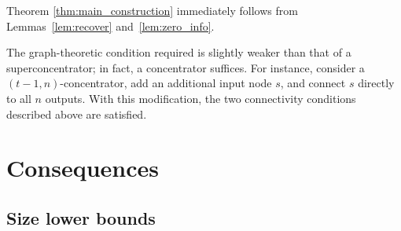 \documentclass[11pt]{article}
\newtheorem{definition}{Definition}
\begin{document}
Theorem \ref{thm:main_construction} immediately follows from Lemmas~\ref{lem:recover} and~\ref{lem:zero_info}.

The graph-theoretic condition required is slightly weaker than that of a superconcentrator; in fact, a concentrator suffices. For instance, consider a $(t-1, n)$-concentrator, add an additional input node $s$, and connect $s$ directly to all $n$ outputs. With this modification, the two connectivity conditions described above are satisfied.




\section{Consequences}

\subsection{Size lower bounds}

\end{document}
